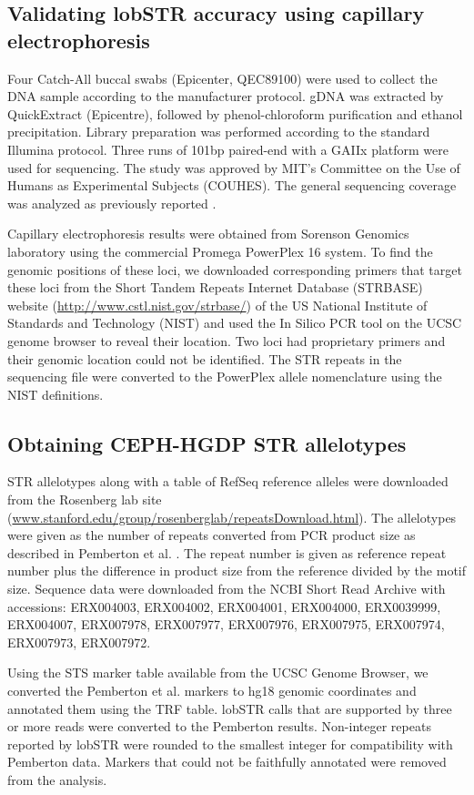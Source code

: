 {\subsection{Validating lobSTR accuracy using capillary electrophoresis}
Four Catch-All buccal swabs (Epicenter, QEC89100) were used to collect the DNA sample according to the manufacturer protocol. gDNA was extracted by QuickExtract (Epicentre), followed by phenol-chloroform purification and ethanol precipitation. Library preparation was performed according to the standard Illumina protocol. Three runs of 101bp paired-end with a GAIIx platform were used for sequencing. The study was approved by MIT's Committee on the Use of Humans as Experimental Subjects (COUHES). The general sequencing coverage was analyzed as previously reported \cite{ErlichEdvardsonHodgesEtAl2011}. 

Capillary electrophoresis results were obtained from Sorenson Genomics laboratory using the commercial Promega PowerPlex 16 system. To find the genomic positions of these loci, we downloaded corresponding primers that target these loci from the Short Tandem Repeats Internet Database (STRBASE) website (\url{http://www.cstl.nist.gov/strbase/}) of the US National Institute of Standards and Technology (NIST) and used the In Silico PCR tool on the UCSC genome browser to reveal their location. Two loci had proprietary primers and their genomic location could not be identified. The STR repeats in the sequencing file were converted to the PowerPlex allele nomenclature using the NIST definitions.

\subsection{Obtaining CEPH-HGDP STR allelotypes}
STR allelotypes along with a table of RefSeq reference alleles were downloaded from the Rosenberg lab site (\url{www.stanford.edu/group/rosenberglab/repeatsDownload.html}). The allelotypes were given as the number of repeats converted from PCR product size as described in Pemberton et al. \cite{PembertonSandefurJakobssonEtAl2009}. The repeat number is given as reference repeat number plus the difference in product size from the reference divided by the motif size. Sequence data were downloaded from the NCBI Short Read Archive with accessions: ERX004003, ERX004002, ERX004001, ERX004000, ERX0039999, ERX004007, ERX007978, ERX007977, ERX007976, ERX007975, ERX007974, ERX007973, ERX007972.

Using the STS marker table available from the UCSC Genome Browser, we converted the Pemberton et al. markers to hg18 genomic coordinates and annotated them using the TRF table. lobSTR calls that are supported by three or more reads were converted to the Pemberton results. Non-integer repeats reported by lobSTR were rounded to the smallest integer for compatibility with Pemberton data. Markers that could not be faithfully annotated were removed from the analysis.

}
